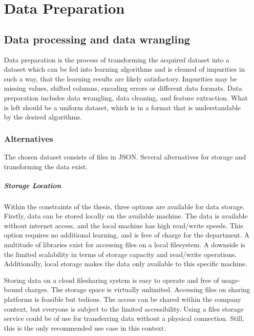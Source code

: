 \chapter{Data Preparation}

	\section{Data processing and data wrangling}
	
    Data preparation is the process of transforming the acquired dataset into a dataset which can be fed into learning algorithms and is cleaned of impurities in such a way, that the learning results are likely satisfactory. Impurities may be missing values, shifted columns, encoding errors or different data formats. 
    Data preparation includes data wrangling, data cleaning, and feature extraction. What is left should be a uniform dataset, which is in a format that is understandable by the desired algorithms.
    
        \subsection{Alternatives}
        The chosen dataset consists of files in \ac{JSON}. Several alternatives for storage and transforming the data exist. 
        
        \paragraph{Storage Location}
        Within the constraints of the thesis, three options are available for data storage. Firstly, data can be stored locally on the available machine. The data is available without internet access, and the local machine has high read/write speeds. This option requires no additional learning, and is free of charge for the department. A multitude of libraries exist for accessing files on a local filesystem. A downside is the limited scalability in terms of storage capacity and read/write operations. Additionally, local storage makes the data only available to this specific machine.
        
        Storing data on a cloud filesharing system is easy to operate and free of usage-bound charges. The storage space is virtually unlimited. Accessing files on sharing platforms is feasible but tedious. The access can be shared within the company context, but everyone is subject to the limited accessibility. Using a files storage service could be of use for transferring data without a physical connection. Still, this is the only recommended use case in this context.
        
